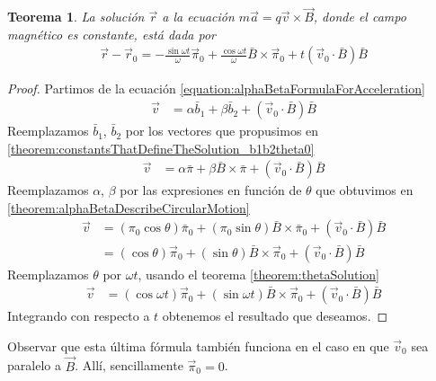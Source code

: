 \documentclass{article}
\newtheorem{theorem}{Teorema}
\begin{document}
  \begin{theorem}
    La solución \(\vec{r}\) a la ecuación \(m \vec{a} = q \vec{v} \times \vec{B}\), donde el campo magnético es constante, está dada por
    \begin{align}
      \vec{r} - \vec{r}_0
      =
      - \frac{\sin \omega t}{\omega}
      \vec{\pi}_0
      + \frac{\cos \omega t}{\omega}
      \bar{B}
      \times
      \vec{\pi}_0
      + t (\vec{v}_0 \cdot \bar{B}) \bar{B}
    \end{align}
  \end{theorem}
  \begin{proof}
    Partimos de la ecuación \eqref{equation:alphaBetaFormulaForAcceleration}
    \begin{align}
      \vec{v}
      &=
      \alpha \bar{b}_1 + \beta \bar{b}_2 + (\vec{v}_0 \cdot \bar{B}) \bar{B}
    \end{align}
    Reemplazamos \(\bar{b}_1\), \(\bar{b}_2\) por los vectores que propusimos en \ref{theorem:constantsThatDefineTheSolution_b1b2theta0}
    \begin{align}
      \vec{v}
      &=
      \alpha \bar{\pi} + \beta \bar{B} \times \bar{\pi} + (\vec{v}_0 \cdot \bar{B}) \bar{B}
    \end{align}
    Reemplazamos \(\alpha\), \(\beta\) por las expresiones en función de \(\theta\) que obtuvimos en \ref{theorem:alphaBetaDescribeCircularMotion}
    \begin{align}
      \vec{v}
      &=
      (\pi_0 \cos \theta) \bar{\pi}_0 + (\pi_0 \sin \theta) \bar{B} \times \bar{\pi}_0 + (\vec{v}_0 \cdot \bar{B}) \bar{B}
      \\
      &=
      (\cos \theta) \vec{\pi}_0 + (\sin \theta) \bar{B} \times \vec{\pi}_0 + (\vec{v}_0 \cdot \bar{B}) \bar{B}
    \end{align}
    Reemplazamos \(\theta\) por \(\omega t\), usando el teorema \ref{theorem:thetaSolution}
    \begin{align}
      \vec{v}
      &=
      (\cos \omega t) \vec{\pi}_0
      + (\sin \omega t) \bar{B} \times \vec{\pi}_0
      + (\vec{v}_0 \cdot \bar{B}) \bar{B}
    \end{align}
    Integrando con respecto a \(t\) obtenemos el resultado que deseamos. 
  \end{proof}

  Observar que esta última fórmula también funciona en el caso en que \(\vec{v}_0\) sea paralelo a \(\vec{B}\).
  Allí, sencillamente \(\vec{\pi}_0 = 0\).
\end{document}
